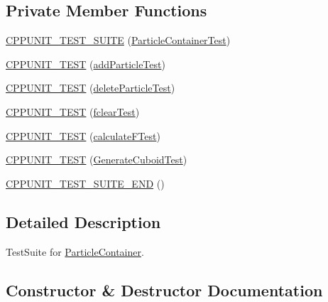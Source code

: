 \subsection*{Private Member Functions}
\begin{DoxyCompactItemize}
\item 
\hyperlink{classParticleContainerTest_ae9afd034703d0c21b00e498da7f263f3}{C\+P\+P\+U\+N\+I\+T\+\_\+\+T\+E\+S\+T\+\_\+\+S\+U\+I\+TE} (\hyperlink{classParticleContainerTest}{Particle\+Container\+Test})
\item 
\hyperlink{classParticleContainerTest_a48b201cc96992dd146d1ef89b84236a3}{C\+P\+P\+U\+N\+I\+T\+\_\+\+T\+E\+ST} (\hyperlink{classParticleContainerTest_a3a4921704ae21a160f9b6c5e086dca5c}{add\+Particle\+Test})
\item 
\hyperlink{classParticleContainerTest_a781a20cd143fb3691ecdc153e9f64a3a}{C\+P\+P\+U\+N\+I\+T\+\_\+\+T\+E\+ST} (\hyperlink{classParticleContainerTest_a310fd3941f72ccbed84840167828152d}{delete\+Particle\+Test})
\item 
\hyperlink{classParticleContainerTest_ac80b1adae5486191918fc38b5deeb156}{C\+P\+P\+U\+N\+I\+T\+\_\+\+T\+E\+ST} (\hyperlink{classParticleContainerTest_aedf461c006cedb3a707d355d9c472107}{fclear\+Test})
\item 
\hyperlink{classParticleContainerTest_abd24480618839a358f528f1db886e22b}{C\+P\+P\+U\+N\+I\+T\+\_\+\+T\+E\+ST} (\hyperlink{classParticleContainerTest_a623a17cee1bfde4ab23127163509d5b4}{calculate\+F\+Test})
\item 
\hyperlink{classParticleContainerTest_a4ccbd4c5f5e2947d3dcb14da5410dcdc}{C\+P\+P\+U\+N\+I\+T\+\_\+\+T\+E\+ST} (\hyperlink{classParticleContainerTest_a18827c80c7e7faba9bb992c38b95d718}{Generate\+Cuboid\+Test})
\item 
\hyperlink{classParticleContainerTest_aa276cd865efaccb4410ed6beb8d0ba4f}{C\+P\+P\+U\+N\+I\+T\+\_\+\+T\+E\+S\+T\+\_\+\+S\+U\+I\+T\+E\+\_\+\+E\+ND} ()
\end{DoxyCompactItemize}


\subsection{Detailed Description}
Test\+Suite for \hyperlink{classParticleContainer}{Particle\+Container}. 

\subsection{Constructor \& Destructor Documentation}
